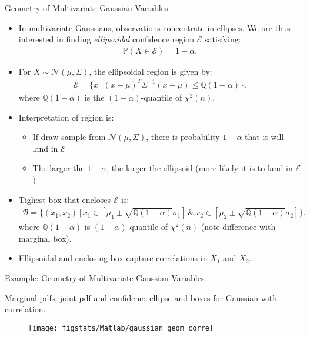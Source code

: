 \documentclass[handout,9pt]{beamer}
\begin{document}
%
\begin{frame}{Geometry of Multivariate Gaussian Variables}

\begin{itemize}
\setlength{\itemsep}{5pt}
\item  In multivariate Gaussians, observations concentrate in ellipses. We are thus interested in finding {\em ellipsoidal} confidence region $\mathcal{E}$ satisfying:
\begin{align*}
\mathbb{P}(X\in \mathcal{E})=1-\alpha.
\end{align*}
\item For $X\sim \mathcal{N}(\mu,\Sigma)$, the ellipsoidal region is given by:
\begin{align*}
\mathcal{E}=\{x\,|\,(x-\mu)^T\Sigma^{-1}(x-\mu)\leq \mathbb{Q}(1-\alpha)\}.
\end{align*}
where $\mathbb{Q}(1-\alpha)$ is the $(1-\alpha)$-quantile of $\chi^2(n)$.  
\item  Interpretation of region is:
\begin{itemize}
\item If draw sample from $\mathcal{N}(\mu,\Sigma)$, there is probability $1-\alpha$ that it will land in $\mathcal{E}$
\item The larger the $1-\alpha$, the larger the ellipsoid (more likely it is to land in $\mathcal{E}$)
\end{itemize}
\item Tighest box that encloses $\mathcal{E}$ is:
\begin{align*}
\mathcal{B}=\{(x_1,x_2)\,|\,x_1\in [\mu_1\pm \sqrt{\mathbb{Q}(1-\alpha)}\sigma_1]\,\&\,x_2\in [\mu_2\pm \sqrt{\mathbb{Q}(1-\alpha)}\sigma_2]\}.
\end{align*}
where $\mathbb{Q}(1-\alpha)$ is  $(1-\alpha)$-quantile of $\chi^2(n)$ (note difference with marginal box). 
\item Ellipsoidal and enclosing box capture correlations in $X_1$ and $X_2$.
\end{itemize}

\end{frame}

%
\begin{frame}{Example: Geometry of Multivariate Gaussian Variables}

Marginal pdfs, joint pdf and confidence ellipse and boxes for Gaussian with correlation. 
\begin{figure}[!htb]
    \centering
	\texttt{[image: figstats/Matlab/gaussian\_geom\_corre]}
\end{figure}

\end{frame}
\end{document}
